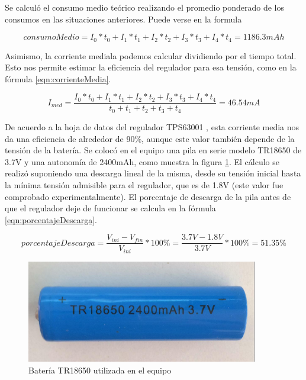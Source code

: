 Se calculó el consumo medio teórico realizando el promedio ponderado de los consumos en las situaciones anteriores. Puede verse en la formula \citep{eqn:consumoMedio}

\begin{equation} \label{eqn:consumoMedio}
consumoMedio = I_{0}*t_{0}+I_{1}*t_{1}+I_{2}*t_{2}+I_{3}*t_{3}+I_{4}*t_{4} = 1186.3 mAh
\end{equation}



Asimismo, la corriente mediala podemos calcular dividiendo por el tiempo total. Esto nos permite estimar la eficiencia del regulador para esa tensión, como en la fórmula \ref{eqn:corrienteMedia}.

\begin{equation} \label{eqn:corrienteMedia}
I_{med} = \frac{I_{0}*t_{0}+I_{1}*t_{1}+I_{2}*t_{2}+I_{3}*t_{3}+I_{4}*t_{4}}{t_{0}+t_{1}+t_{2}+t_{3}+t_{4}}= 46.54mA
\end{equation}

De acuerdo a la hoja de datos del regulador TPS63001 \citep{texas2006}, esta corriente media nos da una eficiencia de alrededor de 90\%, aunque este valor también depende de la tensión de la batería.
Se colocó en el equipo una pila en serie modelo TR18650 de 3.7V y una autonomía de 2400mAh, como muestra la figura \ref{fig:bateria}. El cálculo se realizó suponiendo una descarga lineal de la misma, desde su tensión inicial hasta la mínima tensión admisible para el regulador, que es de 1.8V\citep{texas2006} (este valor fue comprobado experimentalmente). El porcentaje de descarga de la pila antes de que el regulador deje de funcionar se calcula en la fórmula \ref{eqn:porcentajeDescarga}.

\begin{equation} \label{eqn:porcentajeDescarga}
porcentajeDescarga = \frac{V_{ini} - V_{fin}}{V_{ini}} * 100\% = \frac{3.7V- 1.8V}{3.7V} * 100\% = 51.35\%
\end{equation}

\begin{figure}[!htbp]
	\centering	
	\includegraphics[width=0.9\textwidth]{./Figures/bateria.jpeg}			
	\caption{Batería TR18650 utilizada en el equipo}
	\label{fig:bateria}
\end{figure}

